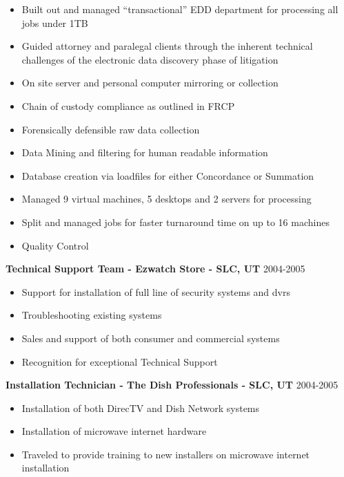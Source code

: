 \documentclass[line,margin]{res}
\begin{document}
\begin{resume}
  \begin{itemize} \itemsep -2pt
  \item Built out and managed “transactional” EDD department for processing all jobs under 1TB
  \item Guided attorney and paralegal clients through the inherent technical challenges of the electronic data discovery phase of litigation
  \item On site server and personal computer mirroring or collection
  \item Chain of custody compliance as outlined in FRCP
  \item Forensically defensible raw data collection 
  \item Data Mining and filtering for human readable information
  \item Database creation via loadfiles for either Concordance or Summation
  \item Managed 9 virtual machines, 5 desktops and 2 servers for processing 
  \item Split and managed jobs for faster turnaround time on up to 16 machines
  \item Quality Control
  \end{itemize}
{\bf Technical Support Team - Ezwatch Store - SLC, UT} \hfill 2004-2005\\
  \begin{itemize} \itemsep -2pt
  \item Support for installation of full line of security systems and dvrs
  \item Troubleshooting existing systems
  \item Sales and support of both consumer and commercial systems
  \item Recognition for exceptional Technical Support
  \end{itemize} 
{\bf Installation Technician - The Dish Professionals - SLC, UT} \hfill 2004-2005\\
  \begin{itemize} \itemsep -2pt
  \item Installation of both DirecTV and Dish Network systems
  \item Installation of microwave internet hardware
  \item Traveled to provide training to new installers on microwave internet installation
  \end{itemize} 	

\end{resume}
\end{document}
